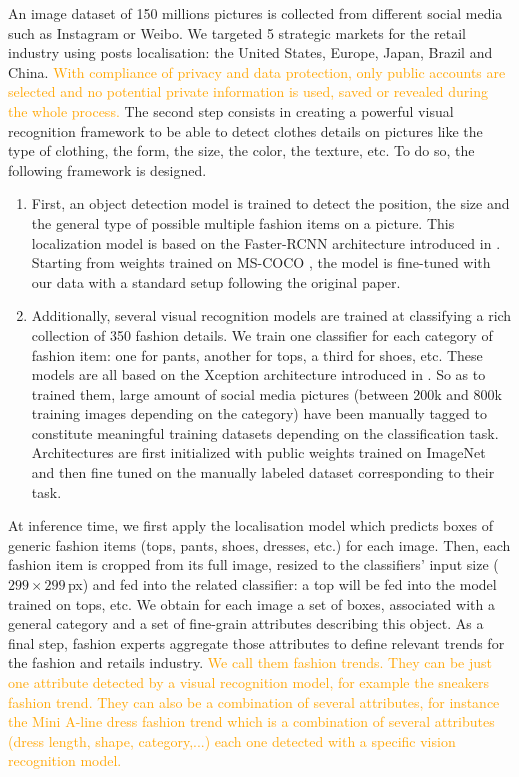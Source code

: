 \documentclass[10pt]{article} %
\begin{document}
An image dataset of 150 millions pictures is collected from different social media such as Instagram or Weibo. We targeted 5 strategic markets for the retail industry using posts localisation: the United States, Europe, Japan, Brazil and China. \textcolor{orange}{With compliance of privacy and data protection, only public accounts are selected and no potential private information is used, saved or revealed during the whole process.}
The second step consists in creating a powerful visual recognition framework to be able to detect clothes details on pictures like the type of clothing, the form, the size, the color, the texture, etc. To do so, the following framework is designed.
\begin{enumerate}
    \item First, an object detection model is trained to detect the position, the size and the general type of possible multiple fashion items on a picture. This localization model is based on the Faster-RCNN architecture introduced in \citet{ren2015}. Starting from weights trained on MS-COCO \citep{lin2014}, the model is fine-tuned with our data with a standard setup following the original paper.
    \item  Additionally, several visual recognition models are trained at classifying a rich collection of 350 fashion details. We train one classifier for each category of fashion item: one for pants, another for tops, a third for shoes, etc. These models are all based on the Xception architecture introduced in \citet{chollet2017}. So as to trained them, large amount of social media pictures (between 200k and 800k training images depending on the category) have been manually tagged to constitute meaningful training datasets depending on the classification task. Architectures are first initialized with public weights trained on ImageNet \citep{russakovsky2014} and then fine tuned on the manually labeled dataset corresponding to their task.
\end{enumerate}

At inference time, we first apply the localisation model which predicts boxes of generic fashion items (tops, pants, shoes, dresses, etc.) for each image. Then, each fashion item is cropped from its full image, resized to the classifiers' input size ($299\times299\,$px) and fed into the related classifier: a top will be fed into the model trained on tops, etc. We obtain for each image a set of boxes, associated with a general category and a set of fine-grain attributes describing this object. As a final step, fashion experts aggregate those attributes to define relevant trends for the fashion and retails industry. \textcolor{orange}{We call them fashion trends. They can be just one attribute detected by a visual recognition model, for example the sneakers fashion trend. They can also be a combination of several attributes, for instance the Mini A-line dress fashion trend which is a combination of several attributes (dress length, shape, category,...) each one detected with a specific vision recognition model.}
\end{document}
